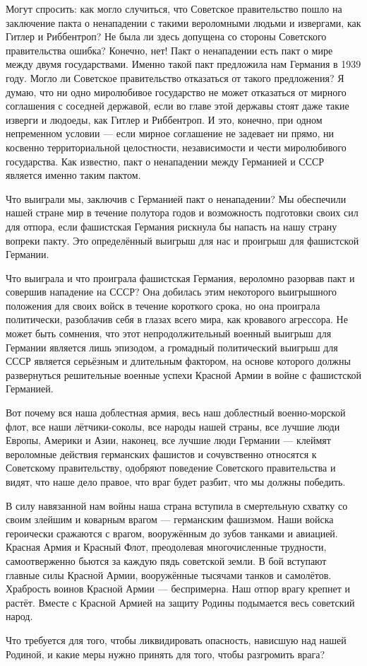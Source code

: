 \documentclass[12pt, a4paper, openany]{book}
\begin{document}
Могут спросить: как могло случиться, что Советское правительство пошло на заключение пакта о ненападении с такими вероломными людьми и извергами, как Гитлер и Риббентроп? Не была ли здесь допущена со стороны Советского правительства ошибка? Конечно, нет! Пакт о ненападении есть пакт о мире между двумя государствами. Именно такой пакт предложила нам Германия в 1939 году. Могло ли Советское правительство отказаться от такого предложения? Я думаю, что ни одно миролюбивое государство не может отказаться от мирного соглашения с соседней державой, если во главе этой державы стоят даже такие изверги и людоеды, как Гитлер и Риббентроп. И это, конечно, при одном непременном условии — если мирное соглашение не задевает ни прямо, ни косвенно территориальной целостности, независимости и чести миролюбивого государства. Как известно, пакт о ненападении между Германией и СССР является именно таким пактом.

Что выиграли мы, заключив с Германией пакт о ненападении? Мы обеспечили нашей стране мир в течение полутора годов и возможность подготовки своих сил для отпора, если фашистская Германия рискнула бы напасть на нашу страну вопреки пакту. Это определённый выигрыш для нас и проигрыш для фашистской Германии.

Что выиграла и что проиграла фашистская Германия, вероломно разорвав пакт и совершив нападение на СССР? Она добилась этим некоторого выигрышного положения для своих войск в течение короткого срока, но она проиграла политически, разоблачив себя в глазах всего мира, как кровавого агрессора. Не может быть сомнения, что этот непродолжительный военный выигрыш для Германии является лишь эпизодом, а громадный политический выигрыш для СССР является серьёзным и длительным фактором, на основе которого должны развернуться решительные военные успехи Красной Армии в войне с фашистской Германией.

Вот почему вся наша доблестная армия, весь наш доблестный военно-морской флот, все наши лётчики-соколы, все народы нашей страны, все лучшие люди Европы, Америки и Азии, наконец, все лучшие люди Германии — клеймят вероломные действия германских фашистов и сочувственно относятся к Советскому правительству, одобряют поведение Советского правительства и видят, что наше дело правое, что враг будет разбит, что мы должны победить.

В силу навязанной нам войны наша страна вступила в смертельную схватку со своим злейшим и коварным врагом — германским фашизмом. Наши войска героически сражаются с врагом, вооружённым до зубов танками и авиацией. Красная Армия и Красный Флот, преодолевая многочисленные трудности, самоотверженно бьются за каждую пядь советской земли. В бой вступают главные силы Красной Армии, вооружённые тысячами танков и самолётов. Храбрость воинов Красной Армии — беспримерна. Наш отпор врагу крепнет и растёт. Вместе с Красной Армией на защиту Родины подымается весь советский народ.

Что требуется для того, чтобы ликвидировать опасность, нависшую над нашей Родиной, и какие меры нужно принять для того, чтобы разгромить врага?
\end{document}
